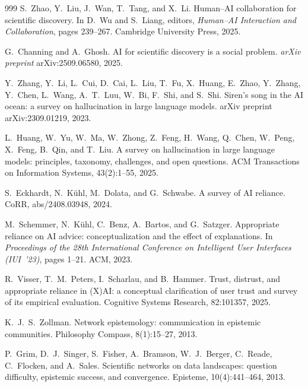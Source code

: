 \begin{thebibliography}{999}
S.~Zhao, Y.~Liu, J.~Wan, T.~Tang, and X.~Li.
\newblock Human--AI collaboration for scientific discovery.
\newblock In D.~Wu and S.~Liang, editors, \emph{Human--AI Interaction and Collaboration}, pages 239--267. Cambridge University Press, 2025.

G.~Channing and A.~Ghosh.
\newblock AI for scientific discovery is a social problem.
\newblock \emph{arXiv preprint} arXiv:2509.06580, 2025.

Y.~Zhang, Y.~Li, L.~Cui, D.~Cai, L.~Liu, T.~Fu, X.~Huang, E.~Zhao, Y.~Zhang,
Y.~Chen, L.~Wang, A.~T.~Luu, W.~Bi, F.~Shi, and S.~Shi.
Siren's song in the AI ocean: a survey on hallucination in large language models.
arXiv preprint arXiv:2309.01219, 2023.

L.~Huang, W.~Yu, W.~Ma, W.~Zhong, Z.~Feng, H.~Wang, Q.~Chen, W.~Peng,
X.~Feng, B.~Qin, and T.~Liu.
A survey on hallucination in large language models: principles, taxonomy, challenges, and open questions.
ACM Transactions on Information Systems, 43(2):1--55, 2025.


S.~Eckhardt, N.~K{\"u}hl, M.~Dolata, and G.~Schwabe.
A survey of AI reliance.
CoRR, abs/2408.03948, 2024.

M.~Schemmer, N.~K{\"u}hl, C.~Benz, A.~Bartos, and G.~Satzger.
Appropriate reliance on AI advice: conceptualization and the effect of explanations.
In \emph{Proceedings of the 28th International Conference on Intelligent User Interfaces (IUI~'23)},
pages 1--21. ACM, 2023.

R.~Visser, T.~M.~Peters, I.~Scharlau, and B.~Hammer.
Trust, distrust, and appropriate reliance in (X)AI: a conceptual clarification of user trust and survey of its empirical evaluation.
Cognitive Systems Research, 82:101357, 2025.


K.~J.~S.~Zollman.
Network epistemology: communication in epistemic communities.
Philosophy Compass, 8(1):15--27, 2013.

P.~Grim, D.~J.~Singer, S.~Fisher, A.~Bramson, W.~J.~Berger, C.~Reade, C.~Flocken, and A.~Sales.
Scientific networks on data landscapes: question difficulty, epistemic success, and convergence.
Episteme, 10(4):441--464, 2013.


\end{thebibliography}
